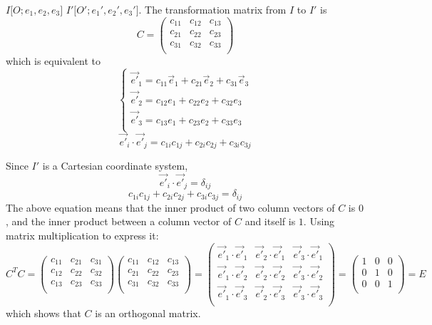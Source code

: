 \documentclass[onecolumn]{ctexart}
\begin{document}
$I \lbrack O; e_1, e_2, e_3 \rbrack$ $I' \lbrack O'; e_1', e_2', e_3' \rbrack$. The transformation matrix from $I$ to $I'$ is
\[
  C = 
  \begin{pmatrix}
    c_{11} & c_{12} & c_{13} \\
    c_{21} & c_{22} & c_{23} \\
    c_{31} & c_{32} & c_{33} \\
  \end{pmatrix}
\]
which is equivalent to
\[
  \begin{cases}
    \vec{e'}_1 = c_{11} \vec{e}_1 + c_{21} \vec{e}_2 + c_{31} \vec{e}_3 \\
    \vec{e'}_2 = c_{12} e_1 + c_{22} e_2 + c_{32} e_3 \\
    \vec{e'}_3 = c_{13} e_1 + c_{23} e_2 + c_{33} e_3 \\
  \end{cases}
\]
\[
  \vec{e'}_i \cdot \vec{e'}_j = c_{1i} c_{1j} + c_{2i} c_{2j} + c_{3i} c_{3j}
\]

Since $I'$ is a Cartesian coordinate system,
\[
  \vec{e'}_i \cdot \vec{e'}_j = \delta_{ij}
\]
\[
  c_{1i} c_{1j} + c_{2i} c_{2j} + c_{3i} c_{3j} = \delta_{ij}
\]
The above equation means that the inner product of two column vectors of $C$ is 
$0$, and the inner product between a column vector of $C$ and itself is $1$. 
Using matrix multiplication to express it:
\[
  C^T C = 
  \begin{pmatrix}
    c_{11} & c_{21} & c_{31} \\
    c_{12} & c_{22} & c_{32} \\
    c_{13} & c_{23} & c_{33} \\
  \end{pmatrix}
  \begin{pmatrix}
    c_{11} & c_{12} & c_{13} \\
    c_{21} & c_{22} & c_{23} \\
    c_{31} & c_{32} & c_{33} \\
  \end{pmatrix} = 
  \begin{pmatrix}
    \vec{e'}_1 \cdot \vec{e'}_1 & \vec{e'}_2 \cdot \vec{e'}_1 & \vec{e'}_3 \cdot \vec{e'}_1 \\
    \vec{e'}_1 \cdot \vec{e'}_2 & \vec{e'}_2 \cdot \vec{e'}_2 & \vec{e'}_3 \cdot \vec{e'}_2 \\
    \vec{e'}_1 \cdot \vec{e'}_3 & \vec{e'}_2 \cdot \vec{e'}_3 & \vec{e'}_3 \cdot \vec{e'}_3 \\
  \end{pmatrix} = 
  \begin{pmatrix}
    1 & 0 & 0 \\
    0 & 1 & 0 \\
    0 & 0 & 1 \\
  \end{pmatrix} = E
\]
which shows that $C$ is an orthogonal matrix.
\end{document}
